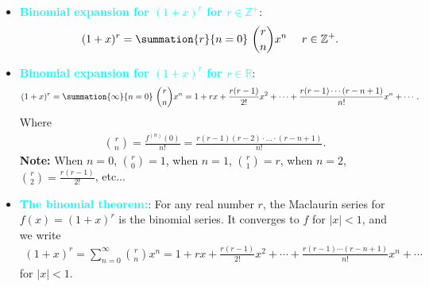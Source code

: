 \documentclass{report}
\begin{document}
\begin{itemize}
            \item \textbf{\textcolor{cyan}{Binomial expansion for $(1+x)^{r}$ for $r\in\mathbb{Z^{+}}$}}:
                \begin{align*}
                    (1+x)^{r}= \summation{r}{n=0}\ \binom{r}{n}x^{n}\ \quad r \in \mathbb{Z^{+}}
                .\end{align*}
            \item \textbf{\textcolor{cyan}{Binomial expansion for $(1+x)^{r}$ for $r\in\mathbb{R}$}}:
                \begin{align*}
                    (1+x)^{r} = \summation{\infty}{n=0}\ \binom{r}{n}x^{n} = 1+rx+ \frac{r(r-1)}{2!}x^2 + \cdots + \frac{r(r-1)\cdots(r-n+1)}{n!}x^n + \cdots
                .\end{align*}
                Where 
                \begin{align*}
            &\binom{r}{n} = \frac{f^{(n)}(0)}{n!} = \frac{r(r-1)(r-2)\cdot ...\cdot (r-n+1)}{n!} 
        .\end{align*}
        \textbf{Note:} When $n=0$, $\binom{r}{0} = 1$, when $n=1$, $\binom{r}{1} = r$, when $n=2$, $\binom{r}{2} = \frac{r(r-1)}{2!} $, etc...
    \item \textbf{\textcolor{cyan}{The binomial theorem:}}:
        For any real number \(r\), the Maclaurin series for \( f(x) = (1 + x)^r \) is the binomial series. It converges to \(f\) for \(|x| < 1\), and we write
        \begin{align*}
            (1 + x)^r = \sum_{n=0}^{\infty} \binom{r}{n} x^n = 1 + rx + \frac{r(r-1)}{2!}x^2 + \cdots + \frac{r(r-1) \cdots (r-n+1)}{n!}x^n + \cdots
        \end{align*}
        for \(|x| < 1\).
\end{itemize}


\pagebreak \bigbreak \noindent 
\end{document}
